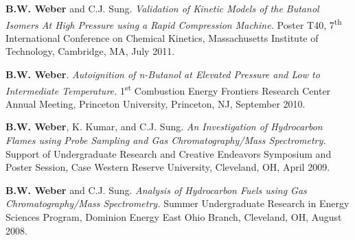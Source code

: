 \documentclass[margin,line]{res}
\newenvironment{list3}{
  \begin{list}{\ding{113}}{%
      \setlength{\itemsep}{0.1in}
      \setlength{\parsep}{0in} \setlength{\parskip}{0in}
      \setlength{\topsep}{0in} \setlength{\partopsep}{0in} 
      \setlength{\leftmargin}{0in}}}{\end{list}}
\begin{document}
\begin{resume}
\begin{list3}
%
\item[] {\bf B.W. Weber} and C.J. Sung. {\em Validation of Kinetic Models of the Butanol Isomers At High Pressure using a Rapid Compression Machine.} Poster T40, 7\textsuperscript{th} International Conference on Chemical Kinetics, Massachusetts Institute of Technology, Cambridge, MA, July 2011.
\item[] {\bf B.W. Weber}. {\em Autoignition of n-Butanol at Elevated Pressure and Low to Intermediate Temperature.} 1\textsuperscript{st} Combustion Energy Frontiers Research Center Annual Meeting, Princeton University, Princeton, NJ, September 2010.
\item[] {\bf B.W. Weber}, K. Kumar, and C.J. Sung. {\em An Investigation of Hydrocarbon Flames using Probe Sampling and Gas Chromatography/Mass Spectrometry.} Support of Undergraduate Research and Creative Endeavors Symposium and Poster Session, Case Western Reserve University, Cleveland, OH, April 2009.
%
\item[] {\bf B.W. Weber} and C.J. Sung. {\em Analysis of Hydrocarbon Fuels using Gas Chromatography/Mass Spectrometry.} Summer Undergraduate Research in Energy Sciences Program, Dominion Energy East Ohio Branch, Cleveland, OH, August 2008.
\end{list3}


\end{resume}
\end{document}
